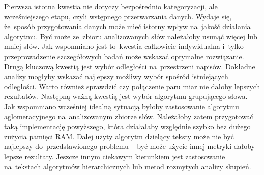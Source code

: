 \documentclass{praca1}
\begin{document}
Pierwsza istotna kwestia nie dotyczy bezpośrednio kategoryzacji, ale wcześniejszego etapu, czyli wstępnego przetwarzania danych. Wydaje się, że~sposób przygotowania danych może mieć istotny wpływ na~jakość działania algorytmu. Być może ze~zbioru analizowanych słów należałoby usunąć więcej lub mniej słów. Jak wspomniano jest to~kwestia całkowicie indywidualna i~tylko przeprowadzenie szczegółowych badań może wskazać optymalne rozwiązanie. Drugą kluczową kwestią jest wybór odległości na~przestrzeni napisów. Dokładne analizy mogłyby wskazać najlepszy możliwy wybór spośród istniejących odległości. Warto również sprawdzić czy połączenie paru miar nie dałoby lepszych rezultatów. Następną ważną kwestią jest wybór algorytmu grupującego słowa. Jak wspomniano wcześniej idealną sytuacją byłoby zastosowanie algorytmu aglomeracyjnego na~analizowanym zbiorze słów. Należałoby zatem przygotować taką implementację powyższego, która działałaby względnie szybko bez dużego zużycia pamięci RAM. Dalej użyty algorytm dzielący teksty może nie być najlepszy do~przedstawionego problemu -- być może użycie innej metryki dałoby lepsze rezultaty. Jeszcze innym ciekawym kierunkiem jest zastosowanie na~tekstach algorytmów hierarchicznych lub metod rozmytych analizy skupień.






\makestatement
\end{document}
